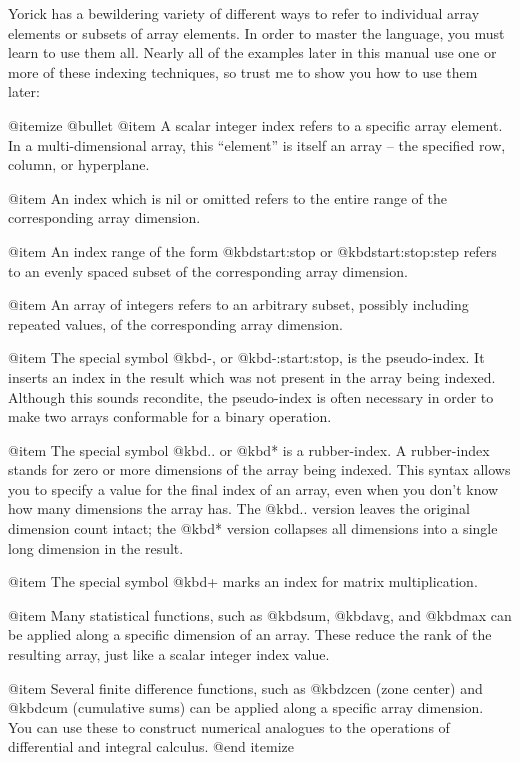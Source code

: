 Yorick has a bewildering variety of different ways to refer to
individual array elements or subsets of array elements.  In order to
master the language, you must learn to use them all.  Nearly all of the
examples later in this manual use one or more of these indexing
techniques, so trust me to show you how to use them later:

@itemize @bullet
@item
A scalar integer index refers to a specific array element.  In a
multi-dimensional array, this ``element'' is itself an array -- the
specified row, column, or hyperplane.

@item
An index which is nil or omitted refers to the entire range of the
corresponding array dimension.

@item
An index range of the form @kbd{start:stop} or @kbd{start:stop:step}
refers to an evenly spaced subset of the corresponding array
dimension.

@item
An array of integers refers to an arbitrary subset, possibly including
repeated values, of the corresponding array dimension.

@item
The special symbol @kbd{-}, or @kbd{-:start:stop}, is the pseudo-index.
It inserts an index in the result which was not present in the array
being indexed.  Although this sounds recondite, the pseudo-index is
often necessary in order to make two arrays conformable for a binary
operation.

@item
The special symbol @kbd{..} or @kbd{*} is a rubber-index.  A
rubber-index stands for zero or more dimensions of the array being
indexed.  This syntax allows you to specify a value for the final index
of an array, even when you don't know how many dimensions the array has.
The @kbd{..} version leaves the original dimension count intact; the
@kbd{*} version collapses all dimensions into a single long dimension in
the result.

@item
The special symbol @kbd{+} marks an index for matrix multiplication.

@item
Many statistical functions, such as @kbd{sum}, @kbd{avg}, and @kbd{max}
can be applied along a specific dimension of an array.  These reduce the
rank of the resulting array, just like a scalar integer index value.

@item
Several finite difference functions, such as @kbd{zcen} (zone center)
and @kbd{cum} (cumulative sums) can be applied along a specific array
dimension.  You can use these to construct numerical analogues to the
operations of differential and integral calculus.
@end itemize


